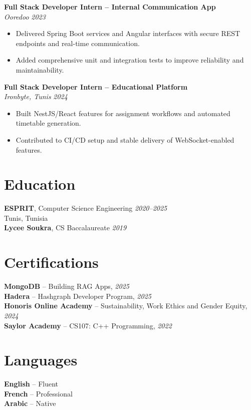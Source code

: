 \documentclass[10pt,a4paper]{article}
\begin{document}
{\vspace{2pt}
\textbf{Full Stack Developer Intern -- Internal Communication App}\\[1pt]
\textit{Ooredoo} \hfill \textit{2023}
\begin{itemize}
  \item Delivered Spring Boot services and Angular interfaces with secure REST endpoints and real-time communication.
  \item Added comprehensive unit and integration tests to improve reliability and maintainability.
\end{itemize}

\vspace{2pt}
\textbf{Full Stack Developer Intern -- Educational Platform}\\[1pt]
\textit{Ironbyte, Tunis} \hfill \textit{2024}
\begin{itemize}
  \item Built NestJS/React features for assignment workflows and automated timetable generation.
  \item Contributed to CI/CD setup and stable delivery of WebSocket-enabled features.
\end{itemize}

}

\vspace{2pt}
\section*{Education}
{\small
\textbf{ESPRIT}, Computer Science Engineering \hfill \textit{2020--2025}\\[1pt]
Tunis, Tunisia\\[2pt]
\textbf{Lycee Soukra}, CS Baccalaureate \hfill \textit{2019}
}

\vspace{2pt}
\section*{Certifications}
{\small
\textbf{MongoDB} -- Building RAG Apps, \textit{2025}\\[1pt]
\textbf{Hadera} -- Hashgraph Developer Program, \textit{2025}\\[1pt]
\textbf{Honoris Online Academy} -- Sustainability, Work Ethics and Gender Equity, \textit{2024}\\[1pt]
\textbf{Saylor Academy} -- CS107: C++ Programming, \textit{2022}
}

\section*{Languages}
{\small
\textbf{English} -- Fluent\\[1pt]
\textbf{French} -- Professional\\[1pt]
\textbf{Arabic} -- Native
}
\end{document}
